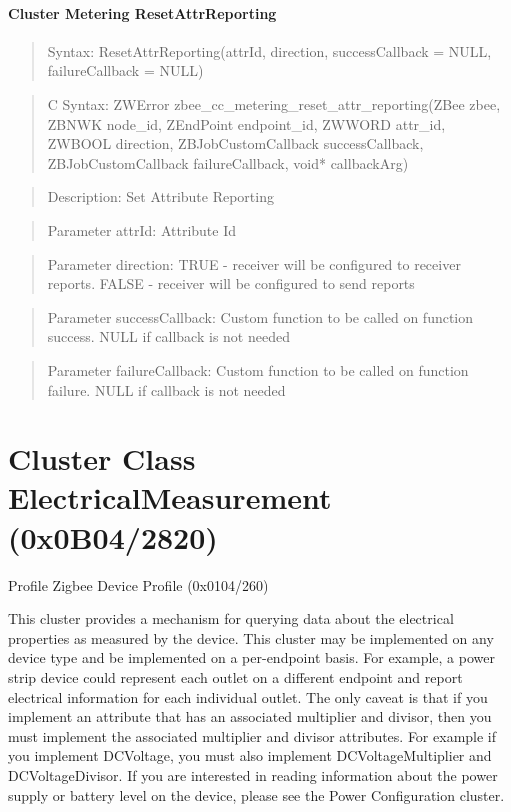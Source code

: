 \paragraph{Cluster Metering ResetAttrReporting}
\begin{quote}Syntax: ResetAttrReporting(attrId, direction, successCallback = NULL, failureCallback = NULL)\end{quote}
\begin{quote}C Syntax: ZWError zbee\_cc\_metering\_reset\_attr\_reporting(ZBee zbee, ZBNWK node\_id, ZEndPoint endpoint\_id, ZWWORD attr\_id, ZWBOOL direction, ZBJobCustomCallback successCallback, ZBJobCustomCallback failureCallback, void* callbackArg)\end{quote}
\begin{quote}Description: Set Attribute Reporting\end{quote}
\begin{quote}Parameter attrId: Attribute Id\end{quote}
\begin{quote}Parameter direction: TRUE  - receiver will be configured to receiver reports. FALSE - receiver will be configured to send reports\end{quote}
\begin{quote}Parameter successCallback: Custom function to be called on function success. NULL if callback is not needed\end{quote}
\begin{quote}Parameter failureCallback: Custom function to be called on function failure. NULL if callback is not needed\end{quote}



\section{Cluster Class ElectricalMeasurement (0x0B04/2820)}

Profile Zigbee Device Profile (0x0104/260)

This cluster provides a mechanism for querying data about the electrical properties as measured by the device. This cluster may be implemented on any device type and be implemented on a per-endpoint basis. For example, a power strip device could represent each outlet on a different endpoint and report electrical information for each individual outlet. The only caveat is that if you implement an attribute that has an associated multiplier and divisor, then you must implement the associated multiplier and divisor attributes. For example if you implement DCVoltage, you must also implement DCVoltageMultiplier and DCVoltageDivisor.  If you are interested in reading information about the power supply or battery level on the device, please see the Power Configuration cluster.
\newline

